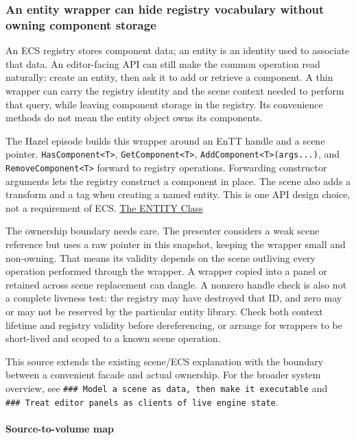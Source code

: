 \subsubsection{An entity wrapper can hide registry vocabulary without owning component storage}\label{an-entity-wrapper-can-hide-registry-vocabulary-without-owning-component-storage}

An ECS registry stores component data; an entity is an identity used to associate that data. An editor-facing API can still make the common operation read naturally: create an entity, then ask it to add or retrieve a component. A thin wrapper can carry the registry identity and the scene context needed to perform that query, while leaving component storage in the registry. Its convenience methods do not mean the entity object owns its components.

The Hazel episode builds this wrapper around an EnTT handle and a scene pointer. \texttt{HasComponent\textless{}T\textgreater{}}, \texttt{GetComponent\textless{}T\textgreater{}}, \texttt{AddComponent\textless{}T\textgreater{}(args...)}, and \texttt{RemoveComponent\textless{}T\textgreater{}} forward to registry operations. Forwarding constructor arguments lets the registry construct a component in place. The scene also adds a transform and a tag when creating a named entity. This is one API design choice, not a requirement of ECS. \href{https://www.youtube.com/watch?v=GfSzeAcsBb0}{The ENTITY Class}

The ownership boundary needs care. The presenter considers a weak scene reference but uses a raw pointer in this snapshot, keeping the wrapper small and non-owning. That means its validity depends on the scene outliving every operation performed through the wrapper. A wrapper copied into a panel or retained across scene replacement can dangle. A nonzero handle check is also not a complete liveness test: the registry may have destroyed that ID, and zero may or may not be reserved by the particular entity library. Check both context lifetime and registry validity before dereferencing, or arrange for wrappers to be short-lived and scoped to a known scene operation.

This source extends the existing scene/ECS explanation with the boundary between a convenient facade and actual ownership. For the broader system overview, see \texttt{\#\#\#\ Model\ a\ scene\ as\ data,\ then\ make\ it\ executable} and \texttt{\#\#\#\ Treat\ editor\ panels\ as\ clients\ of\ live\ engine\ state}.

\paragraph{Source-to-volume map}\label{source-to-volume-map-1}

